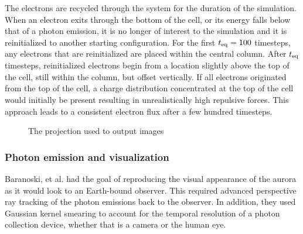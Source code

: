 \documentclass[twocolumn]{article}
\renewcommand{\insertfigure}[3]{\begin{figure}[tbh]
\centering
	\makebox[\columnwidth][c]{
	\texttt{[image: \#1]}
	}
\caption{#3}
\label{#1}
\end{figure}}
\begin{document}
The electrons are recycled through the system for the duration of the simulation.  When an electron exits through the bottom of the cell, or its energy falls below that of a photon emission, it is no longer of interest to the simulation and it is reinitialized to another starting configuration.  For the first $t_{\mathrm{eq}}=100$ timesteps, any electrons that are reinitialized are placed within the central column.  After $t_{\mathrm{eq}}$ timesteps, reinitialized electrons begin from a location slightly above the top of the cell, still within the column, but offset vertically.  If all electrons originated from the top of the cell, a charge distribution concentrated at the top of the cell would initially be present resulting in unrealistically high repulsive forces. This approach leads to a consistent electron flux after a few hundred timesteps.

\insertfigure{../presentation/img/projection.pdf}{0.7}{The projection used to output images}

\subsubsection*{Photon emission and visualization }


Baranoski, \cite{Baranoski2003} et al. had the goal of reproducing the visual appearance of the aurora as it would look to an Earth-bound observer.  This required advanced perspective ray tracking of the photon emissions back to the observer. In addition, they used Gaussian kernel smearing to account for the temporal resolution of a photon collection device, whether that is a camera or the human eye.
\end{document}
